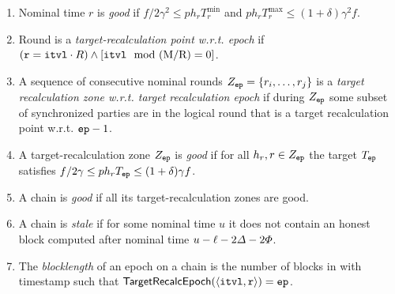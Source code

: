 \begin{definition}
    \begin{enumerate}[label=\FlatSteel, leftmargin=*, nosep]
        \item Nominal time $r$ is \emph{good} if $f / 2\gamma^2 \le p h_r T_r^{\min}$ and $p h_r T_r^{\max} \le (1 + \delta)\gamma^2 f$.

        \item Round \protocolTime{\interval}{\round} is a \emph{target-recalculation point w.r.t. epoch} \epoch if $(\mathtt{r} = \mathtt{itvl} \cdot R) \wedge [\mathtt{itvl} \mod  \allowbreak (\mathrm{M} / \mathrm{R}) = 0]$.

        \item A sequence of consecutive nominal rounds $Z_\mathtt{ep} = \{ r_i, \ldots, r_j \}$ is a \emph{target recalculation zone w.r.t. target recalculation epoch} \epoch if during $Z_\mathtt{ep}$ some subset of synchronized parties are in the logical round that is a target recalculation point w.r.t. $\mathtt{ep} - 1$.

        \item A target-recalculation zone $Z_\mathtt{ep}$ is \emph{good} if for all $h_r, r \in Z_\mathtt{ep}$ the target $T_\mathtt{ep}$ satisfies $f / 2\gamma \le p h_r T_\mathtt{ep} \le (1 + \delta)\gamma f$.

        \item A chain is \emph{good} if all its target-recalculation zones are good.

        \item A chain is \emph{stale} if for some nominal time $u$ it does not contain an honest block computed after nominal time $u - \ell - 2\varDelta - 2\varPhi$.

        \item The \emph{blocklength} of an epoch \epoch on a chain \chain is the number of blocks in \chain with timestamp \protocolTime{\interval}{\cdot} such that $\mathsf{TargetRecalcEpoch}(\langle \mathtt{itvl}, \mathtt{r} \rangle) = \mathtt{ep}$.
    \end{enumerate}
\end{definition}

